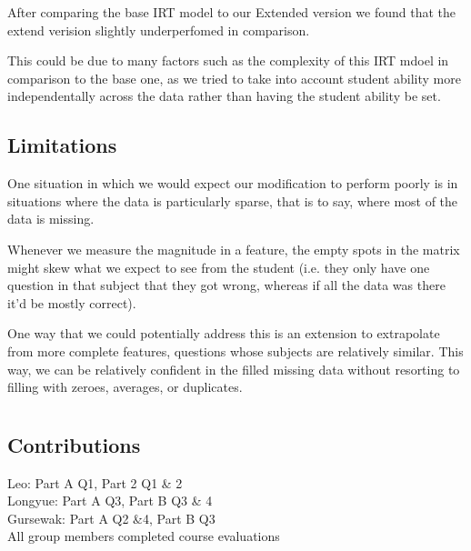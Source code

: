 \documentclass[twocolumn]{article}
\begin{document}
After comparing the base IRT model to our Extended version we found that the extend verision slightly underperfomed in comparison.

This could be due to many factors such as the complexity of this IRT mdoel in comparison to the base one, as we tried to take into account student ability more independentally across the data rather than having the student ability be set. 

\subsection{Limitations}

One situation in which we would expect our modification to perform poorly is in situations where the data is particularly sparse, that is to say, where most of the data is missing. 

Whenever we measure the magnitude in a feature, the empty spots in the matrix might skew what we expect to see from the student (i.e. they only have one question in that subject that they got wrong, whereas if all the data was there it’d be mostly correct).

One way that we could potentially address this is an extension to extrapolate from more complete features, questions whose subjects are relatively similar. This way, we can be relatively confident in the filled missing data without resorting to filling with zeroes, averages, or duplicates.

\section{}

\subsection{Contributions}
Leo: Part A Q1, Part 2 Q1 \& 2\\
Longyue: Part A Q3, Part B Q3 \& 4\\
Gursewak: Part A Q2 \&4, Part B Q3\\
All group members completed course evaluations
\end{document}
